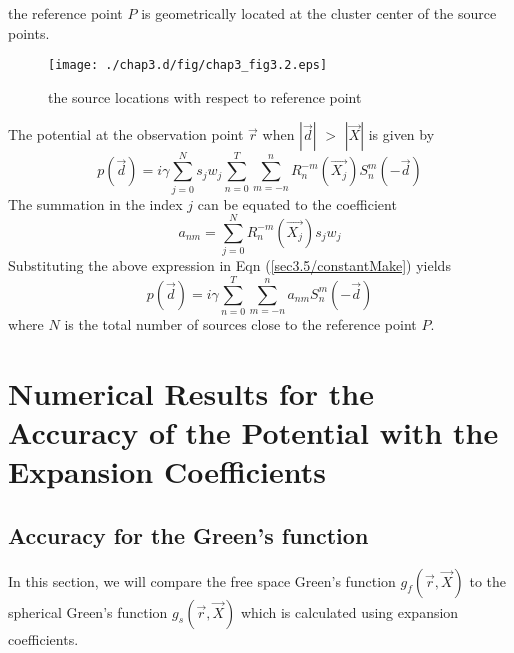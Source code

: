 the reference point  $P$ is geometrically located at the cluster center of the source points.
\begin{figure}[h!]
\begin{center}
\texttt{[image: ./chap3.d/fig/chap3\_fig3.2.eps]}
\caption{ the source locations with respect to reference point}
\label{centerSource}
\end{center}
\end{figure}
The potential at the observation point $\vec{r}$  when 
$|\vec{d}|$ $>$ $|\vec{X}|$ is given by
\begin{equation}
\label{sec3.5/constantMake}
  p(\vec{d}) = i\gamma\sum_{j=0}^{N}s_{j} w_j \sum_{n=0}^{T}\sum_{m= -n}^{n}R_{n}^{-m}(\vec{X_{j}}) S_{n}^{m}(-\vec{d})
 \end{equation}
The summation in the index $j$ can be equated to the coefficient 
 \begin{equation}
\label{sec3.5/constant1}
 a_{nm} = \sum_{j=0}^{N} R_{n}^{-m}(\vec{X_{j}}) s_j w_j
 \end{equation}
 Substituting the above expression in Eqn  (\ref{sec3.5/constantMake}) yields
 \begin{equation}
\label{sec3.5/constant2}
 p(\vec{d}) = i\gamma\sum_{n=0}^{T}\sum_{m= -n}^{n} a_{nm} S_{n}^{m}(-\vec{d})
 \end{equation}
where $N$ is the total number of 
sources close to the reference point $P$.

\newpage

\section{Numerical Results for  the Accuracy of the Potential with the Expansion Coefficients}
\subsection{Accuracy for the Green's function}
In this section, we will compare the free space Green's function  $g_f(\vec{r},\vec{X})$ to the spherical Green's function $g_s(\vec{r},\vec{X})$ which is calculated using  expansion coefficients. 


